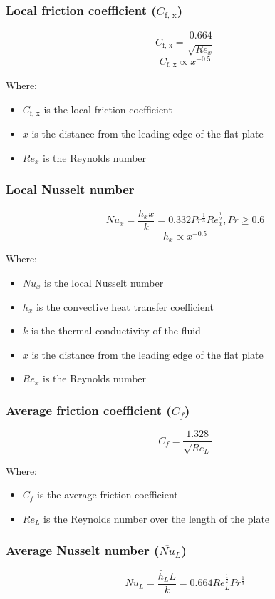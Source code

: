 \documentclass[11pt]{article}
\begin{document}
\subsubsection{Local friction coefficient (\(C_{\text{f, x}}\))}
\label{sec:org1138a94}
\[C_{\text{f, x}} = \frac{0.664}{\sqrt{Re_x}}\]
\[C_{\text{f, x}} \propto x^{-0.5}\]

Where:
\begin{itemize}
\item \(C_{\text{f, x}}\) is the local friction coefficient
\item \(x\) is the distance from the leading edge of the flat plate
\item \(Re_x\) is the Reynolds number
\end{itemize}

\subsubsection{Local Nusselt number}
\label{sec:orgfd31455}
\[Nu_x = \frac{h_x x}{k} = 0.332 Pr^{\frac{1}{3}} Re_x^{\frac{1}{2}}, Pr \ge 0.6\]
\[h_x \propto x^{-0.5}\]

Where:
\begin{itemize}
\item \(Nu_x\) is the local Nusselt number
\item \(h_x\) is the convective heat transfer coefficient
\item \(k\) is the thermal conductivity of the fluid
\item \(x\) is the distance from the leading edge of the flat plate
\item \(Re_x\) is the Reynolds number
\end{itemize}

\subsubsection{Average friction coefficient (\(C_f\))}
\label{sec:orgf47f443}
\[C_f = \frac{1.328}{\sqrt{Re_L}}\]

Where:
\begin{itemize}
\item \(C_f\) is the average friction coefficient
\item \(Re_L\) is the Reynolds number over the length of the plate
\end{itemize}

\subsubsection{Average Nusselt number (\(\overline{Nu}_L\))}
\label{sec:org8dead33}
\[\overline{Nu}_L = \frac{\bar{h}_L L}{k} = 0.664 Re_L^{\frac{1}{2}} Pr^{\frac{1}{3}}\]
\end{document}
